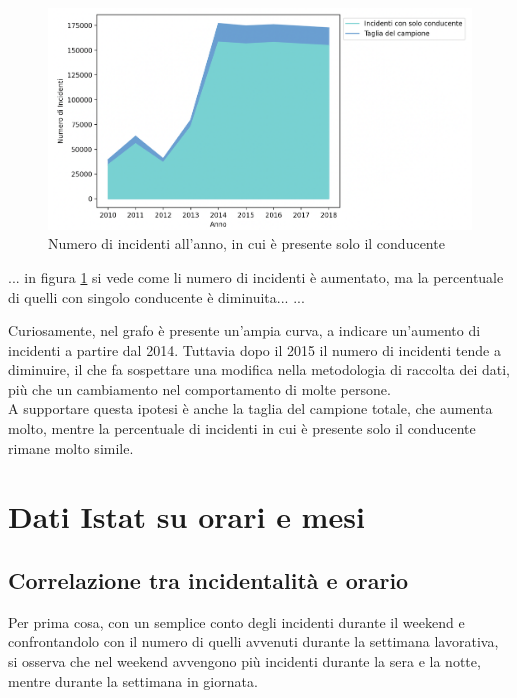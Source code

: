 \documentclass[a4paper]{report}
\begin{document}
\begin{figure}
    \includegraphics[width=\linewidth]{../src/incidenti/incidenti_senza_coords/anno/incremento_incidenti.png}
    \caption{Numero di incidenti all'anno, in cui è presente solo il conducente}
    \label{fig:incremento-incidenti}
\end{figure}

...
in figura \ref{fig:incremento-incidenti} si vede come li numero di incidenti è aumentato, ma la percentuale di quelli con singolo conducente è diminuita...
...


Curiosamente, nel grafo è presente un'ampia curva, a indicare un'aumento di incidenti 
a partire dal 2014. Tuttavia dopo il 2015 il numero di incidenti tende a diminuire, il che 
fa sospettare una modifica nella metodologia di raccolta dei dati, più che un cambiamento 
nel comportamento di molte persone.\\
A supportare questa ipotesi è anche la taglia del campione totale, che aumenta molto, mentre la 
percentuale di incidenti in cui è presente solo il conducente rimane molto simile.


\section{Dati Istat su orari e mesi}

\subsection{Correlazione tra incidentalità e orario}

Per prima cosa, con un semplice conto degli incidenti durante il weekend 
e confrontandolo con il numero di quelli avvenuti durante la 
settimana lavorativa, si osserva che nel weekend avvengono più incidenti 
durante la sera e la notte, mentre durante la settimana in giornata.
\end{document}
